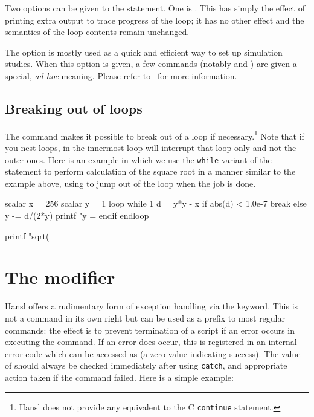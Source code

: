 Two options can be given to the  statement. One is
. This has simply the effect of printing extra output
to trace progress of the loop; it has no other effect and the
semantics of the loop contents remain unchanged.

The  option is mostly used as a quick and
efficient way to set up simulation studies. When this option is given,
a few commands (notably  and ) are given a
special, \emph{ad hoc} meaning. Please refer to \GUG\ for more
information.
 
\subsection{Breaking out of loops}
\label{sec:loop-break}

The  command makes it possible to break out of a loop if
necessary.\footnote{Hansl does not provide any equivalent to the C
  \texttt{continue} statement.} Note that if you nest loops,
 in the innermost loop will interrupt that loop only and
not the outer ones.  Here is an example in which we use the
\texttt{while} variant of the  statement to perform
calculation of the square root in a manner similar to the example
above, using  to jump out of the loop when the job is done.
\begin{code}
scalar x = 256
scalar y = 1
loop while 1
    d = y*y - x
    if abs(d) < 1.0e-7
        break
    else
        y -= d/(2*y)
        printf "y = %
    endif
endloop

printf "sqrt(%
\end{code}

\section{The  modifier}

Hansl offers a rudimentary form of exception handling via the
 keyword. This is not a command in its own right but can be
used as a prefix to most regular commands: the effect is to prevent
termination of a script if an error occurs in executing the
command. If an error does occur, this is registered in an internal
error code which can be accessed as  (a zero value
indicating success). The value of  should always be
checked immediately after using \texttt{catch}, and appropriate action
taken if the command failed. Here is a simple example:

